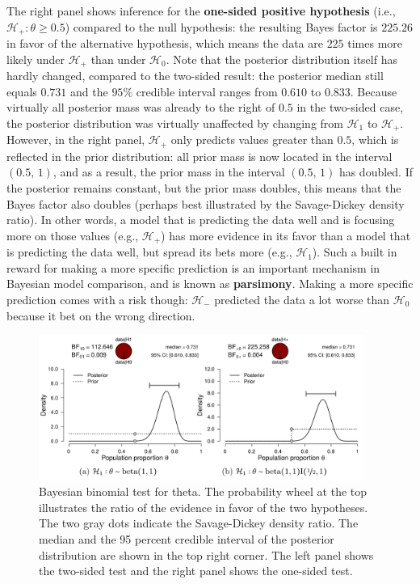 \documentclass[
  letterpaper,
  DIV=11,
  numbers=noendperiod]{scrreprt}
\begin{document}
The right panel shows inference for the \textbf{one-sided positive
hypothesis} (i.e., \(\mathcal{H}_+: \theta \geq 0.5\)) compared to the
null hypothesis: the resulting Bayes factor is \(225.26\) in favor of
the alternative hypothesis, which means the data are \(225\) times more
likely under \(\mathcal{H}_+\) than under \(\mathcal{H}_0\). Note that
the posterior distribution itself has hardly changed, compared to the
two-sided result: the posterior median still equals \(0.731\) and the
\(95\%\) credible interval ranges from \(0.610\) to \(0.833\). Because
virtually all posterior mass was already to the right of \(0.5\) in the
two-sided case, the posterior distribution was virtually unaffected by
changing from \(\mathcal{H}_1\) to \(\mathcal{H}_+\). However, in the
right panel, \(\mathcal{H}_+\) only predicts values greater than
\(0.5\), which is reflected in the prior distribution: all prior mass is
now located in the interval \((0.5\text{, } 1)\), and as a result, the
prior mass in the interval \((0.5\text{, } 1)\) has doubled. If the
posterior remains constant, but the prior mass doubles, this means that
the Bayes factor also doubles (perhaps best illustrated by the
Savage-Dickey density ratio). In other words, a model that is predicting
the data well and is focusing more on those values (e.g.,
\(\mathcal{H}_+\)) has more evidence in its favor than a model that is
predicting the data well, but spread its bets more (e.g.,
\(\mathcal{H}_1\)). Such a built in reward for making a more specific
prediction is an important mechanism in Bayesian model comparison, and
is known as \textbf{parsimony}. Making a more specific prediction comes
with a risk though: \(\mathcal{H}_-\) predicted the data a lot worse
than \(\mathcal{H}_0\) because it bet on the wrong direction.

\begin{figure}

{\centering \includegraphics[width=0.95\textwidth,height=\textheight]{Figures/beerTasteResultsPriorPostOneTwoSided.png}

}

\caption{Bayesian binomial test for theta. The probability wheel at the
top illustrates the ratio of the evidence in favor of the two
hypotheses. The two gray dots indicate the Savage-Dickey density ratio.
The median and the 95 percent credible interval of the posterior
distribution are shown in the top right corner. The left panel shows the
two-sided test and the right panel shows the one-sided test.}

\end{figure}
\end{document}
